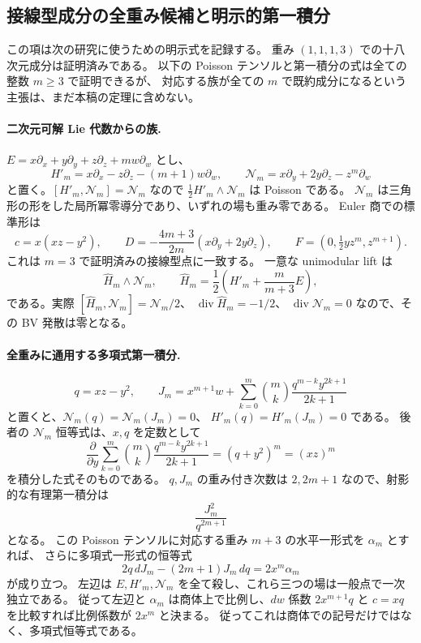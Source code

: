 \subsection{接線型成分の全重み候補と明示的第一積分}
\label{subsec:tangent-allm-research-v33}

この項は次の研究に使うための明示式を記録する。
重み $(1,1,1,3)$ での十八次元成分は証明済みである。
以下の Poisson テンソルと第一積分の式は全ての整数 $m\geq3$ で証明できるが、
対応する族が全ての $m$ で既約成分になるという主張は、まだ本稿の定理に含めない。

\paragraph{二次元可解 Lie 代数からの族.}
$E=x\partial_x+y\partial_y+z\partial_z+mw\partial_w$ とし、
\[
 H'_m=x\partial_x-z\partial_z-(m+1)w\partial_w,
 \qquad \mathcal N_m=x\partial_y+2y\partial_z-z^m\partial_w
\]
と置く。$[H'_m,\mathcal N_m]=\mathcal N_m$ なので
$\frac12H'_m\wedge\mathcal N_m$ は Poisson である。
$\mathcal N_m$ は三角形の形をした局所冪零導分であり、いずれの場も重み零である。
Euler 商での標準形は
\[
 c=x(xz-y^2),\qquad
 D=-\frac{4m+3}{2m}(x\partial_y+2y\partial_z),\qquad
 F=(0,\tfrac12yz^m,z^{m+1}).
\]
これは $m=3$ で証明済みの接線型点に一致する。
一意な unimodular lift は
\[
 \widehat H_m\wedge\mathcal N_m,\qquad
 \widehat H_m=\frac12\left(H'_m+\frac{m}{m+3}E\right),
\]
である。実際
$[\widehat H_m,\mathcal N_m]=\mathcal N_m/2$、
$\operatorname{div}\widehat H_m=-1/2$、
$\operatorname{div}\mathcal N_m=0$ なので、その BV 発散は零となる。

\paragraph{全重みに通用する多項式第一積分.}
\[
 q=xz-y^2,\qquad
 J_m=x^{m+1}w+
 \sum_{k=0}^m\binom mk\frac{q^{m-k}y^{2k+1}}{2k+1}
\]
と置くと、$\mathcal N_m(q)=\mathcal N_m(J_m)=0$、
$H'_m(q)=H'_m(J_m)=0$ である。
後者の $\mathcal N_m$ 恒等式は、$x,q$ を定数として
\[
 \frac{\partial}{\partial y}
 \sum_{k=0}^m\binom mk\frac{q^{m-k}y^{2k+1}}{2k+1}
 =(q+y^2)^m=(xz)^m
\]
を積分した式そのものである。
$q,J_m$ の重み付き次数は $2,2m+1$ なので、射影的な有理第一積分は
\[
 \frac{J_m^2}{q^{2m+1}}
\]
となる。
この Poisson テンソルに対応する重み $m+3$ の水平一形式を $\alpha_m$ とすれば、
さらに多項式一形式の恒等式
\[
 2q\,dJ_m-(2m+1)J_m\,dq=2x^m\alpha_m
\]
が成り立つ。
左辺は $E,H'_m,\mathcal N_m$ を全て殺し、これら三つの場は一般点で一次独立である。
従って左辺と $\alpha_m$ は商体上で比例し、$dw$ 係数
$2x^{m+1}q$ と $c=xq$ を比較すれば比例係数が $2x^m$ と決まる。
従ってこれは商体での記号だけではなく、多項式恒等式である。

